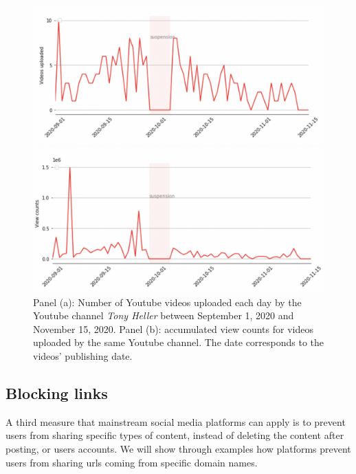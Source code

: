 \documentclass{article}
\begin{document}
\begin{figure}
	\centering
		\begin{multicols}{1}
			\includegraphics[scale=0.35]{./img/tony/fig1_tony.png}
		\end{multicols}
		
		\begin{multicols}{1}
			\includegraphics[scale=0.35]{./img/tony/fig2_tony.png}
		\end{multicols}
	\caption{Panel (a): Number of Youtube videos uploaded each day by the Youtube channel {\it Tony Heller} between September 1, 2020 and November 15, 2020. Panel (b): accumulated view counts for videos uploaded by the same Youtube channel. The date corresponds to the videos’  publishing date. 
}
	\label{fig1_tony}
\end{figure}

\subsection{Blocking links}

A third measure that mainstream social media platforms can apply is to prevent users from sharing specific types of content, instead of deleting the content after posting, or users accounts. We will show through examples how platforms prevent users from sharing urls coming from specific domain names.
\end{document}
